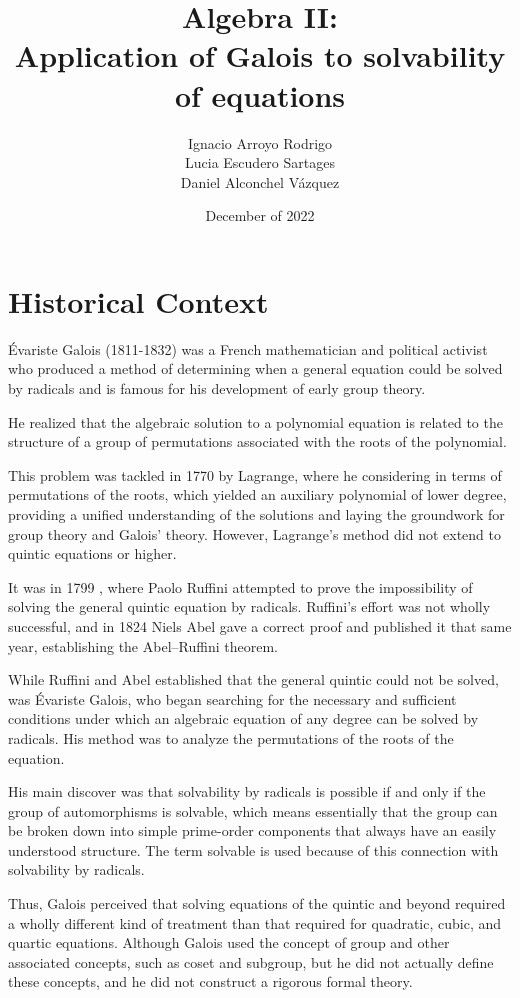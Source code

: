 \documentclass[a4paper, 10pt]{article}
\title{Algebra II: \\ Application of Galois to solvability of equations}
\author{
Ignacio Arroyo Rodrigo \\
Lucia Escudero Sartages \\
Daniel Alconchel Vázquez}
\date{December of 2022}
\theoremstyle{plain}
\theoremstyle{definition}
\theoremstyle{remark}
\begin{document}
	\maketitle
	\newpage
	\tableofcontents
	\newpage
	
	\section{Historical Context}
Évariste Galois (1811-1832) was a French mathematician and political activist who produced a method of determining when a general equation could be solved by radicals and is famous for his development of early group theory. 

He realized that the algebraic solution to a polynomial equation is related to the structure of a group of permutations associated with the roots of the polynomial.

This problem was tackled in 1770 by Lagrange, where he considering in terms of permutations of the roots, which yielded an auxiliary polynomial of lower degree, providing a unified understanding of the solutions and laying the groundwork for group theory and Galois' theory. However, Lagrange's method did not extend to quintic equations or higher. 

It was in 1799 , where Paolo Ruffini attempted to prove the impossibility of solving the general quintic equation by radicals. Ruffini’s effort was not wholly successful, and in 1824 Niels Abel gave a correct proof and published it that same year, establishing the Abel–Ruffini theorem.


While Ruffini and Abel established that the general quintic could not be solved, was Évariste Galois, who began searching for the necessary and sufficient conditions under which an algebraic equation of any degree can be solved by radicals. His method was to analyze the permutations of the roots of the equation. 

His main discover was that solvability by radicals is possible if and only if the group of automorphisms is solvable, which means essentially that the group can be broken down into simple prime-order components that always have an easily understood structure. The term solvable is used because of this connection with solvability by radicals.

Thus, Galois perceived that solving equations of the quintic and beyond required a wholly different kind of treatment than that required for quadratic, cubic, and quartic equations. Although Galois used the concept of group and other associated concepts, such as coset and subgroup, but he did not actually define these concepts, and he did not construct a rigorous formal theory.
\end{document}
